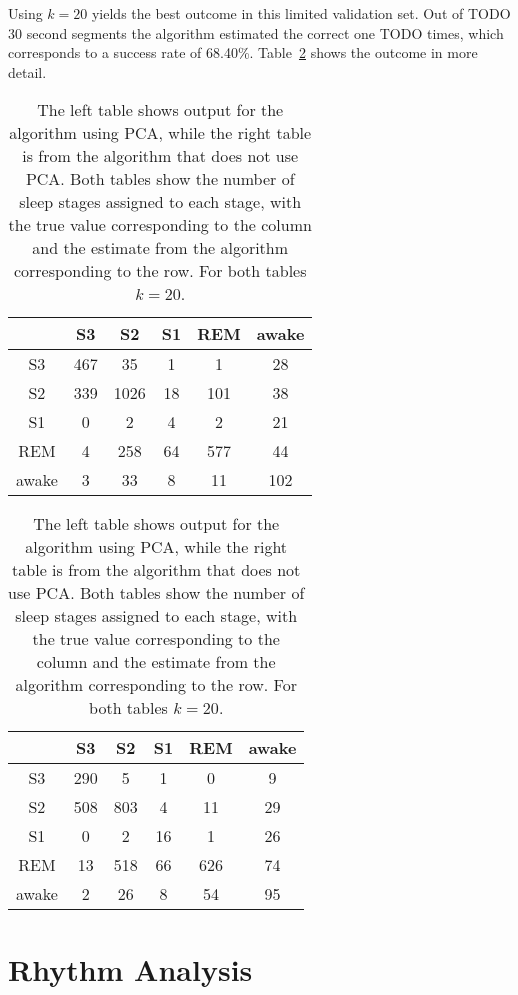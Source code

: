 Using $k=20$ yields the best outcome in this limited validation set. Out of TODO 30 second segments the algorithm estimated the correct one TODO times, which corresponds to a success rate of 68.40\%. Table~\ref{tab:error_validation} shows the outcome in more detail.

\begin{table}
	\centering
	\begin{subtable}{0.48\textwidth}
		\begin{tabular}{c|ccccc}
			    & S3  & S2  & S1 & REM & awake \\
			\hline
			S3 & 467  & 35  & 1  & 1  & 28 \\
			S2 & 339  & 1026  & 18  & 101  & 38 \\
			S1 & 0  & 2  & 4  & 2  & 21 \\
			REM & 4  & 258  & 64  & 577  & 44 \\
			awake & 3  & 33  & 8  & 11  & 102 \\
		\end{tabular}
	\end{subtable}
	\hfill
	\begin{subtable}{0.48\textwidth}
		\begin{tabular}{c|ccccc}
			   & S3  & S2  & S1 & REM & awake \\
			\hline
			S3 & 290  & 5  & 1  & 0  & 9 \\
			S2 & 508  & 803  & 4  & 11  & 29 \\
			S1 & 0  & 2  & 16  & 1  & 26 \\
			REM & 13  & 518  & 66  & 626  & 74 \\
			awake & 2  & 26  & 8  & 54  & 95 \\
		\end{tabular}
	\end{subtable}
	
	\caption{The left table shows output for the algorithm using PCA, while the right table is from the algorithm that does not use PCA. Both tables show the number of sleep stages assigned to each stage, with the true value corresponding to the column and the estimate from the algorithm corresponding to the row. For both tables $k=20$.}
	\label{tab:error_validation}
\end{table}


\section{Rhythm Analysis}
\label{sec:rhythm_analysis}

